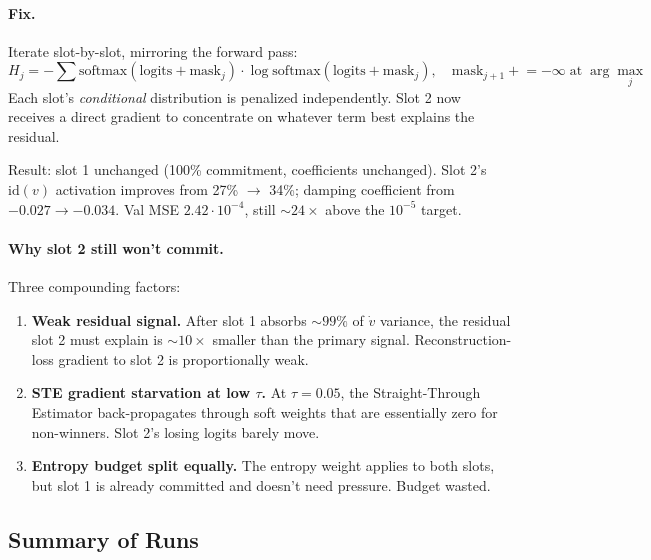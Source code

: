\paragraph{Fix.} Iterate slot-by-slot, mirroring the forward pass:
\[
    H_j = -\!\!\sum \mathrm{softmax}(\mathrm{logits} + \mathrm{mask}_j)
          \cdot \log \mathrm{softmax}(\mathrm{logits} + \mathrm{mask}_j),
    \quad
    \mathrm{mask}_{j+1} \mathrel{+}= -\infty \;\text{at}\; \arg\max_j
\]
Each slot's \emph{conditional} distribution is penalized
independently. Slot 2 now receives a direct gradient to concentrate on
whatever term best explains the residual.

\medskip

Result: slot 1 unchanged (100\% commitment, coefficients unchanged).
Slot 2's $\mathrm{id}(v)$ activation improves from 27\% $\to$ 34\%;
damping coefficient from $-0.027 \to -0.034$. Val MSE $2.42 \cdot
10^{-4}$, still $\sim 24\times$ above the $10^{-5}$ target.

\paragraph{Why slot 2 still won't commit.} Three compounding factors:

\begin{enumerate}
    \item \textbf{Weak residual signal.} After slot 1 absorbs $\sim
          99\%$ of $\dot{v}$ variance, the residual slot 2 must explain
          is $\sim 10\times$ smaller than the primary signal.
          Reconstruction-loss gradient to slot 2 is proportionally weak.
    \item \textbf{STE gradient starvation at low $\tau$.} At $\tau =
          0.05$, the Straight-Through Estimator back-propagates through
          soft weights that are essentially zero for non-winners.
          Slot 2's losing logits barely move.
    \item \textbf{Entropy budget split equally.} The entropy weight
          applies to both slots, but slot 1 is already committed and
          doesn't need pressure. Budget wasted.
\end{enumerate}

\subsection*{Summary of Runs}

